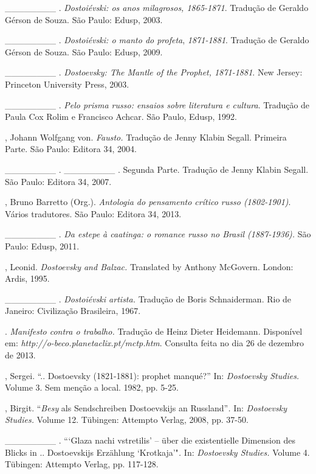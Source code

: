\begin{Parskip}
\_\_\_\_\_\_\_\_ . \emph{Dostoiévski: os anos milagrosos, 1865-1871}.
Tradução de Geraldo Gérson de Souza. São Paulo: Edusp, 2003.

\_\_\_\_\_\_\_\_ . \emph{Dostoiévski: o manto do profeta},
\emph{1871-1881}. Tradução de Geraldo Gérson de Souza. São Paulo: Edusp,
2009.

\_\_\_\_\_\_\_\_ . \emph{Dostoevsky: The Mantle of the Prophet,
1871-1881}. New Jersey: Princeton University Press, 2003.

\_\_\_\_\_\_\_\_ . \emph{Pelo prisma russo: ensaios sobre literatura e
cultura}. Tradução de Paula Cox Rolim e Francisco Achcar. São Paulo,
Edusp, 1992.

, Johann Wolfgang von. \emph{Fausto.} Tradução de Jenny Klabin
Segall. Primeira Parte. São Paulo: Editora 34, 2004.

\_\_\_\_\_\_\_\_ . \_\_\_\_\_\_\_\_ . Segunda Parte. Tradução de Jenny
Klabin Segall. São Paulo: Editora 34, 2007.

, Bruno Barretto (Org.). \emph{Antologia do pensamento crítico
russo (1802-1901)}. Vários tradutores. São Paulo: Editora 34, 2013.

\_\_\_\_\_\_\_\_ . \emph{Da estepe à caatinga: o romance russo no Brasil
(1887-1936).} São Paulo: Edusp, 2011.

, Leonid. \emph{Dostoevsky and Balzac.} Translated by Anthony
McGovern. London: Ardis, 1995.

\_\_\_\_\_\_\_\_ . \emph{Dostoiévski artista.} Tradução de Boris
Schnaiderman. Rio de Janeiro: Civilização Brasileira, 1967.

 . \emph{Manifesto contra o trabalho.} Tradução de Heinz
Dieter Heidemann. Disponível em:
\emph{http://o-beco.planetaclix.pt/mctp.htm}.
Consulta feita no dia 26 de dezembro de 2013.

, Sergei. ``.. Dostoevsky (1821-1881): prophet manqué?'' In:
\emph{Dostoevsky Studies.} Volume 3. Sem menção a local. 1982, pp. 5-25.

, Birgit. ``\emph{Besy} als Sendschreiben Dostoevskijs an
Russland''\emph{.} In: \emph{Dostoevsky Studies.} Volume 12. Tübingen:
Attempto Verlag, 2008, pp. 37-50.

\_\_\_\_\_\_\_\_ . ```Glaza nachi vstretilis' -- über die existentielle
Dimension des Blicks in .. Dostoevskijs Erzählung `Krotkaja'"\emph{.}
In: \emph{Dostoevsky Studies.} Volume 4. Tübingen: Attempto Verlag, pp.
117-128.


\end{Parskip}
